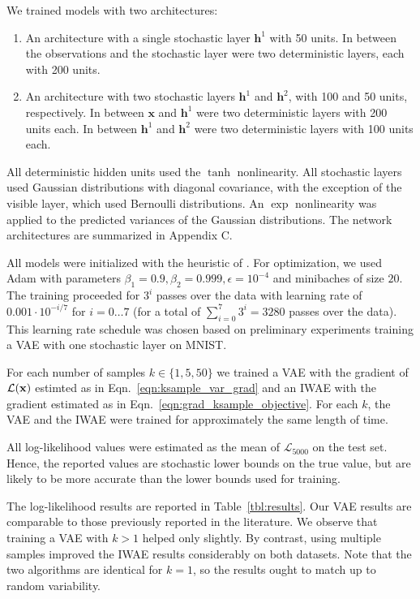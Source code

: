 \documentclass{article} %
\newcommand{\hid}{\mathbf{h}}
\newcommand{\hidLayer}[1]{\hid^{#1}}
\newcommand{\obs}{\mathbf{x}}
\newcommand{\varBound}{\mathcal{L}}
\newcommand{\numSamples}{k}
\newcommand{\isBoundK}[1]{\mathcal{L}_{#1}}
\begin{document}
We trained models with two architectures:
\begin{enumerate}
\item An architecture with a single stochastic layer $\hidLayer{1}$ with 50 units. In between the observations and the stochastic layer were two deterministic layers, each with 200 units.
\item An architecture with two stochastic layers $\hidLayer{1}$ and $\hidLayer{2}$, with 100 and 50 units, respectively. In between $\obs$ and $\hidLayer{1}$ were two deterministic layers with 200 units each. In between $\hidLayer{1}$ and $\hidLayer{2}$ were two deterministic layers with 100 units each.
\end{enumerate}
All deterministic hidden units used the $\tanh$ nonlinearity. All stochastic layers used Gaussian distributions with diagonal covariance, with the exception of the visible layer, which used Bernoulli distributions. An $\exp$ nonlinearity was applied to the predicted variances of the Gaussian distributions. The network architectures are summarized in Appendix C.



All models were initialized with the heuristic of \citet{initialization}. For optimization, we used Adam \citep{adam} with parameters $\beta_1=0.9,\beta_2=0.999,\epsilon=10^{-4}$ and minibaches of size $20$. The training proceeded for $3^i$ passes over the data with learning rate of $0.001\cdot 10^{-i/7}$ for $i=0\ldots 7$ (for a total of $\sum_{i=0}^7 3^i=3280$ passes over the data). This learning rate schedule was chosen based on preliminary experiments training a VAE with one stochastic layer on MNIST. 

For each number of samples $\numSamples\in \{1,5,50\}$ we trained a VAE with the gradient of $\varBound(\bf{x})$ estimted as in Eqn.~\ref{eqn:ksample_var_grad} and an IWAE with the gradient estimated as in Eqn.~\ref{eqn:grad_ksample_objective}. For each $\numSamples$, the VAE and the IWAE were trained for approximately the same length of time.

All log-likelihood values were estimated as the mean of $\isBoundK{5000}$ on the test set. Hence, the reported values are stochastic lower bounds on the true value, but are likely to be more accurate than the lower bounds used for training. 

The log-likelihood results are reported in Table~\ref{tbl:results}. Our VAE results are comparable to those previously reported in the literature. We observe that training a VAE with $\numSamples > 1$ helped only slightly. By contrast, using multiple samples improved the IWAE results considerably on both datasets. Note that the two algorithms are identical for $\numSamples=1$, so the results ought to match up to random variability. 
\end{document}
